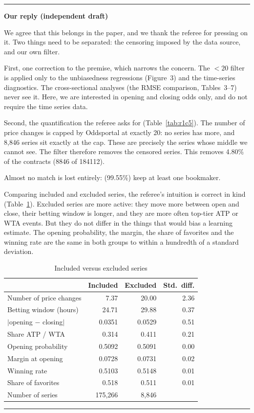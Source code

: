 \documentclass[letterpaper,12pt]{article}
\newcounter{b}
\newenvironment{ourreply}
  {\par\medskip\noindent\textcolor{ourcol}{\rule{\linewidth}{1pt}}%
   \par\nobreak\vspace{3pt}%
   \noindent\textbf{\textcolor{ourcol}{Our reply (independent draft)}}%
   \par\nobreak\vspace{3pt}}
  {\par\vspace{3pt}%
   \noindent\textcolor{ourcol}{\rule{\linewidth}{0.4pt}}\par\medskip}
\begin{document}
\begin{enumerate}
\begin{ourreply}
We agree that this belongs in the paper, and we thank the referee for
pressing on it. Two things need to be separated: the censoring imposed by the
data source, and our own filter.

First, one correction to the premise, which narrows the concern. The
$<20$ filter is applied only to the unbiasedness regressions (Figure~3) and
the time-series diagnostics. The cross-sectional analyses (the RMSE comparison, Tables~3--7) never see it. Here, we are interested in opening and closing odds only, and do not require the time series data.

Second, the quantification the referee asks for (Table~\ref{tab:r1c5}). The
number of price changes is capped by Oddsportal at exactly 20: no series has
more, and 8{,}846 series sit exactly at the cap. These are precisely the
series whose middle we cannot see. The filter therefore removes the censored
series. This removes 4.80\% of the contracts (8846 of 184112).

Almost no match is lost entirely: (99.55\%) keep at least one bookmaker.

Comparing included and excluded series, the referee's intuition is correct in
kind (Table~\ref{tab:r1c6}). Excluded series are more active: they move more
between open and close, their betting window is longer, and they are more
often top-tier ATP or WTA events. But they do not differ in the things that
would bias a learning estimate. The opening probability, the margin, the
share of favorites and the winning rate are the same in both groups to
within a hundredth of a standard deviation.

\begin{table}[h]
\centering
\caption{Included versus excluded series}
\label{tab:r1c6}
\small
\begin{tabular}{lrrr}
\toprule
 & Included & Excluded & Std.\ diff. \\
\midrule
Number of price changes            & 7.37   & 20.00  & 2.36 \\
Betting window (hours)             & 24.71  & 29.88  & 0.37 \\
$|$opening $-$ closing$|$          & 0.0351 & 0.0529 & 0.51 \\
Share ATP / WTA                    & 0.314  & 0.411  & 0.21 \\
\midrule
Opening probability                & 0.5092 & 0.5091 & 0.00 \\
Margin at opening                  & 0.0728 & 0.0731 & 0.02 \\
Winning rate                       & 0.5103 & 0.5148 & 0.01 \\
Share of favorites                 & 0.518  & 0.511  & 0.01 \\
\midrule
Number of series                   & 175{,}266 & 8{,}846 & \\
\bottomrule
\end{tabular}
\end{table}


\end{ourreply}
\end{enumerate}
\end{document}
